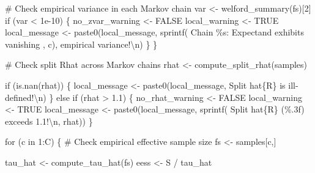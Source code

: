 \documentclass[
  letterpaper,
  DIV=11,
  numbers=noendperiod]{scrartcl}
\newenvironment{Shaded}{\begin{snugshade}}{\end{snugshade}}
\newcommand{\CharTok}[1]{\textcolor[rgb]{0.13,0.47,0.30}{#1}}
\newcommand{\CommentTok}[1]{\textcolor[rgb]{0.37,0.37,0.37}{#1}}
\newcommand{\ControlFlowTok}[1]{\textcolor[rgb]{0.00,0.23,0.31}{#1}}
\newcommand{\DecValTok}[1]{\textcolor[rgb]{0.68,0.00,0.00}{#1}}
\newcommand{\FloatTok}[1]{\textcolor[rgb]{0.68,0.00,0.00}{#1}}
\newcommand{\KeywordTok}[1]{\textcolor[rgb]{0.00,0.23,0.31}{#1}}
\newcommand{\NormalTok}[1]{\textcolor[rgb]{0.00,0.23,0.31}{#1}}
\newcommand{\OperatorTok}[1]{\textcolor[rgb]{0.37,0.37,0.37}{#1}}
\newcommand{\SpecialCharTok}[1]{\textcolor[rgb]{0.37,0.37,0.37}{#1}}
\newcommand{\StringTok}[1]{\textcolor[rgb]{0.13,0.47,0.30}{#1}}
\begin{document}
\begin{Shaded}
\begin{Highlighting}[]
      \CommentTok{\# Check empirical variance in each Markov chain}
\NormalTok{      var }\OperatorTok{\textless{}{-}}\NormalTok{ welford\_summary(fs)[}\DecValTok{2}\NormalTok{]}
      \ControlFlowTok{if}\NormalTok{ (var }\OperatorTok{\textless{}} \FloatTok{1e{-}10}\NormalTok{) \{}
\NormalTok{        no\_zvar\_warning }\OperatorTok{\textless{}{-}}\NormalTok{ FALSE}
\NormalTok{        local\_warning }\OperatorTok{\textless{}{-}}\NormalTok{ TRUE}
\NormalTok{        local\_message }\OperatorTok{\textless{}{-}}
\NormalTok{          paste0(local\_message,}
\NormalTok{                 sprintf(}\StringTok{\textquotesingle{}  Chain }\SpecialCharTok{\%s}\StringTok{: Expectand exhibits vanishing \textquotesingle{}}\NormalTok{, c),}
                         \StringTok{\textquotesingle{}empirical variance!}\CharTok{\textbackslash{}n}\StringTok{\textquotesingle{}}\NormalTok{)}
\NormalTok{      \}}
\NormalTok{    \}}
  
    \CommentTok{\# Check split Rhat across Markov chains}
\NormalTok{    rhat }\OperatorTok{\textless{}{-}}\NormalTok{ compute\_split\_rhat(samples)}

    \ControlFlowTok{if}\NormalTok{ (}\KeywordTok{is}\NormalTok{.nan(rhat)) \{}
\NormalTok{      local\_message }\OperatorTok{\textless{}{-}}\NormalTok{ paste0(local\_message,}
                              \StringTok{\textquotesingle{}  Split hat}\SpecialCharTok{\{R\}}\StringTok{ is ill{-}defined!}\CharTok{\textbackslash{}n}\StringTok{\textquotesingle{}}\NormalTok{)}
\NormalTok{    \} }\ControlFlowTok{else} \ControlFlowTok{if}\NormalTok{ (rhat }\OperatorTok{\textgreater{}} \FloatTok{1.1}\NormalTok{) \{}
\NormalTok{      no\_rhat\_warning }\OperatorTok{\textless{}{-}}\NormalTok{ FALSE}
\NormalTok{      local\_warning }\OperatorTok{\textless{}{-}}\NormalTok{ TRUE}
\NormalTok{      local\_message }\OperatorTok{\textless{}{-}}
\NormalTok{        paste0(local\_message,}
\NormalTok{               sprintf(}\StringTok{\textquotesingle{}  Split hat}\SpecialCharTok{\{R\}}\StringTok{ (}\SpecialCharTok{\%.3f}\StringTok{) exceeds 1.1!}\CharTok{\textbackslash{}n}\StringTok{\textquotesingle{}}\NormalTok{, rhat))}
\NormalTok{    \}}

    \ControlFlowTok{for}\NormalTok{ (c }\KeywordTok{in} \DecValTok{1}\NormalTok{:C) \{}
      \CommentTok{\# Check empirical effective sample size}
\NormalTok{      fs }\OperatorTok{\textless{}{-}}\NormalTok{ samples[c,]}
      
\NormalTok{      tau\_hat }\OperatorTok{\textless{}{-}}\NormalTok{ compute\_tau\_hat(fs)}
\NormalTok{      eess }\OperatorTok{\textless{}{-}}\NormalTok{ S }\OperatorTok{/}\NormalTok{ tau\_hat}
      

\end{Highlighting}
\end{Shaded}
\end{document}
